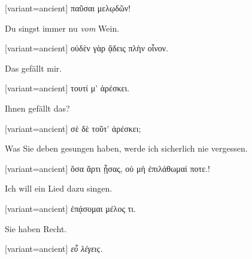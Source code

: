 \switchcolumn

\begin{greek}[variant=ancient]%
παῦσαι μελῳδῶν!

\end{greek}%
\switchcolumn*

Du singst immer nu \emph{vom} Wein. 

\switchcolumn

\begin{greek}[variant=ancient]%
οὐδὲν γὰρ ᾄδεις πλὴν οἶνον.

\end{greek}%
\switchcolumn*

Das gefällt mir. 

\switchcolumn

\begin{greek}[variant=ancient]%
τουτί μ' ἀρέσκει.

\end{greek}%
\switchcolumn*

Ihnen gefällt das? 

\switchcolumn

\begin{greek}[variant=ancient]%
σὲ δὲ τοῦτ' ἀρέσκει;

\end{greek}%
\switchcolumn*

Was Sie deben gesungen haben, werde ich sicherlich nie vergessen. 

\switchcolumn

\begin{greek}[variant=ancient]%
ὅσα ἄρτι ᾖσας, οὐ μὴ ἐπιλάθωμαί ποτε.!

\end{greek}%
\switchcolumn*

Ich will ein Lied dazu singen. 

\switchcolumn

\begin{greek}[variant=ancient]%
ἐπᾴσομαι μέλος τι.

\end{greek}%
Sie haben Recht. 

\switchcolumn

\begin{greek}[variant=ancient]%
\emph{εὖ λέγεις.}

\end{greek}%
\switchcolumn*

